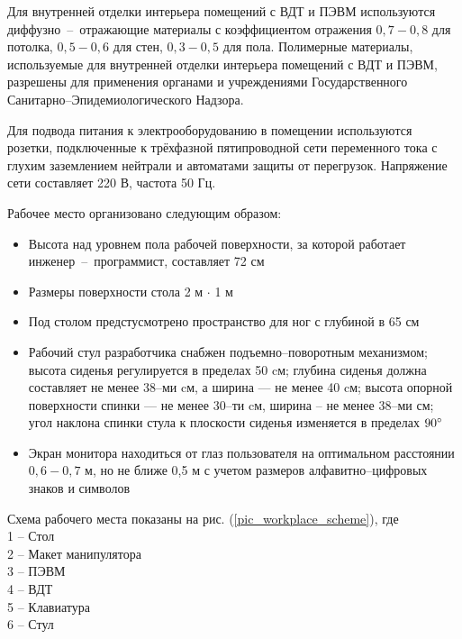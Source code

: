 Для внутренней отделки интерьера помещений с ВДТ и ПЭВМ используются
диффузно~--~отражающие материалы с коэффициентом отражения $0,7 - 0,8$ для потолка,
$0,5 - 0,6$ для стен, $0,3 - 0,5$ для пола. Полимерные материалы, используемые для
внутренней отделки интерьера помещений с ВДТ и ПЭВМ, разрешены для применения
органами и учреждениями Государственного Санитарно--Эпидемиологического
Надзора.

Для подвода питания к электрооборудованию в помещении используются розетки,
подключенные к трёхфазной пятипроводной сети переменного тока с глухим
заземлением нейтрали и автоматами защиты от перегрузок. Напряжение сети
составляет 220 В, частота 50 Гц.

Рабочее место организовано следующим образом:
\begin{itemize}
    \item   Высота над уровнем пола рабочей поверхности, за которой работает
            инженер~--~программист, составляет 72 см
    \item   Размеры поверхности стола 2 м $\cdot$ 1 м
    \item   Под столом предстусмотрено пространство для ног с глубиной в 65 см
    \item   Рабочий стул разработчика снабжен подъемно--поворотным механизмом; высота
            сиденья регулируется в пределах 50 cм; глубина сиденья должна составляет
            не менее 38--ми cм, а ширина --- не менее 40 cм;
            высота опорной поверхности спинки --- не менее 30--ти cм, ширина – не
            менее 38--ми см; угол наклона спинки стула к плоскости сиденья
            изменяется в пределах $90 \degree$
    \item   Экран монитора находиться от глаз пользователя на оптимальном
            расстоянии $0,6 - 0,7$ м, но не ближе 0,5 м с учетом размеров
            алфавитно--цифровых знаков и символов
\end{itemize}

Схема рабочего места показаны на рис. (\ref{pic_workplace_scheme}), где \\
1 -- Стол                \\
2 -- Макет манипулятора  \\
3 -- ПЭВМ                \\
4 -- ВДТ                 \\
5 -- Клавиатура          \\
6 -- Стул

